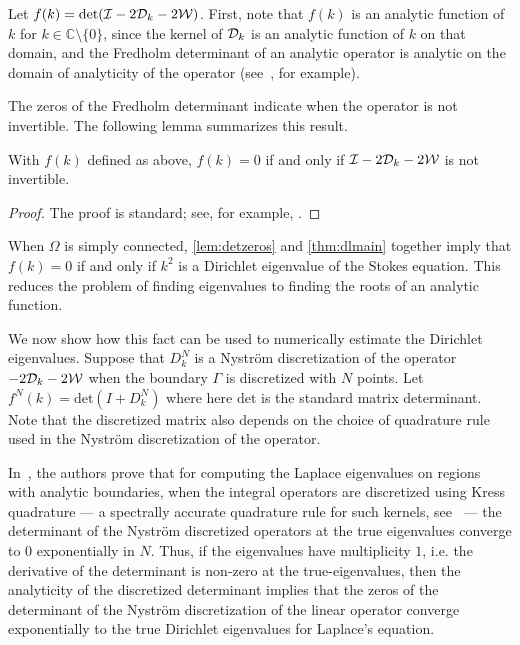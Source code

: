 Let $f(k) = \text{det}(\mathcal I - 2{\mathcal D}_{k} - 2{\mathcal W})$.
First, note that $f(k)$ is an analytic function of $k$
for $k \in \mathbb{C} \setminus \{0 \}$, since the kernel
of ${\mathcal D}_{k}$ is an analytic function of $k$ on that domain, 
and the Fredholm determinant of an analytic operator 
is analytic on the domain of analyticity
of the operator (see~\cite{zhao2015robust}, for example).

The zeros of the Fredholm determinant indicate when the
operator is not invertible.
The following lemma summarizes this result.
\begin{lem} \label{lem:detzeros}
  With $f(k)$ defined as above, $f(k) = 0$ if and only if
  $\mathcal I - 2{\mathcal D}_{k} -2{\mathcal W}$ is not invertible.
\end{lem}
\begin{proof}
  The proof is standard; see, for example,
  \cite[p. 34]{simon2005trace}.
\end{proof}

When $\Omega$ is simply connected, \cref{lem:detzeros} and 
\cref{thm:dlmain} together imply that $f(k) = 0$
if and only if $k^2$ 
is a Dirichlet eigenvalue of the Stokes equation.
This reduces the problem of finding eigenvalues to
finding the roots of an analytic function.

We now show how this fact can be used to numerically
estimate the Dirichlet eigenvalues.
Suppose that $D_{k}^{N}$ is a Nystr\"{o}m discretization 
of the operator $-2{\mathcal D}_{k} - 2{\mathcal W}$ when the boundary 
$\Gamma$ is discretized with $N$ points. 
Let $f^{N}(k) = \text{det}(I + D_{k}^{N})$
where here $\text{det}$ is the standard matrix determinant.
Note that the discretized matrix also depends on the choice
of quadrature rule used in the Nystr\"{o}m discretization
of the operator.

In~\cite{zhao2015robust}, the authors prove that
for computing the Laplace eigenvalues on regions with 
analytic boundaries, when the integral operators are
discretized using Kress quadrature --- a spectrally accurate
quadrature rule for such kernels, see~\cite{kress1991boundary} ---
the determinant of the Nystr\"{o}m discretized operators
at the true eigenvalues converge to $0$ exponentially
in $N$.
Thus, if the eigenvalues have multiplicity $1$,
i.e. the derivative of the determinant is non-zero
at the true-eigenvalues, then the analyticity of the
discretized determinant implies that the zeros
of the determinant of the Nystr\"{o}m discretization
of the linear operator converge exponentially to
the true Dirichlet eigenvalues for Laplace's equation.

